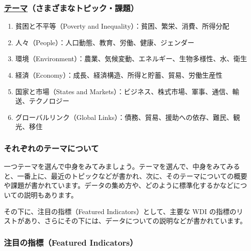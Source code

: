 \documentclass[
  xelatex, ja=standard]{bxjsbook}
\providecommand{\tightlist}{%
  \setlength{\itemsep}{0pt}\setlength{\parskip}{0pt}}
\theoremstyle{definition}
\theoremstyle{definition}
\theoremstyle{definition}
\theoremstyle{definition}
\theoremstyle{remark}
\begin{document}
\hypertarget{ux30c6ux30fcux30deux3055ux307eux3056ux307eux306aux30c8ux30d4ux30c3ux30afux8ab2ux984c}{%
\subsubsection{\texorpdfstring{\href{https://datatopics.worldbank.org/world-development-indicators/}{テーマ}（さまざまなトピック・課題）}{テーマ（さまざまなトピック・課題）}}\label{ux30c6ux30fcux30deux3055ux307eux3056ux307eux306aux30c8ux30d4ux30c3ux30afux8ab2ux984c}}

\begin{enumerate}
\def\labelenumi{\arabic{enumi}.}
\tightlist
\item
  貧困と不平等（Poverty and Inequality）：貧困、繁栄、消費、所得分配
\item
  人々（People）：人口動態、教育、労働、健康、ジェンダー
\item
  環境（Environment）：農業、気候変動、エネルギー、生物多様性、水、衛生
\item
  経済（Economy）：成長、経済構造、所得と貯蓄、貿易、労働生産性
\item
  国家と市場（States and Markets）：ビジネス、株式市場、軍事、通信、輸送、テクノロジー
\item
  グローバルリンク（Global Links）：債務、貿易、援助への依存、難民、観光、移住
\end{enumerate}

\hypertarget{ux305dux308cux305eux308cux306eux30c6ux30fcux30deux306bux3064ux3044ux3066}{%
\subsubsection{それぞれのテーマについて}\label{ux305dux308cux305eux308cux306eux30c6ux30fcux30deux306bux3064ux3044ux3066}}

一つテーマを選んで中身をみてみましょう。テーマを選んで、中身をみてみると、一番上に、最近のトピックなどが書かれ、次に、そのテーマについての概要や課題が書かれています。データの集め方や、どのように標準化するかなどについての説明もあります。

その下に、注目の指標（Featured Indicators）として、主要な WDI の指標のリストがあり、さらにその下には、データについての説明などが書かれています。

\hypertarget{ux6ce8ux76eeux306eux6307ux6a19featured-indicators}{%
\subsubsection{注目の指標（Featured Indicators）}\label{ux6ce8ux76eeux306eux6307ux6a19featured-indicators}}
\end{document}
